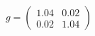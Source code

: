 \documentclass[preview]{standalone}
\begin{document}
\begin{align*}
g = \begin{pmatrix} 1.04 & 0.02 \\ 0.02 & 1.04 \end{pmatrix}
\end{align*}
\end{document}
